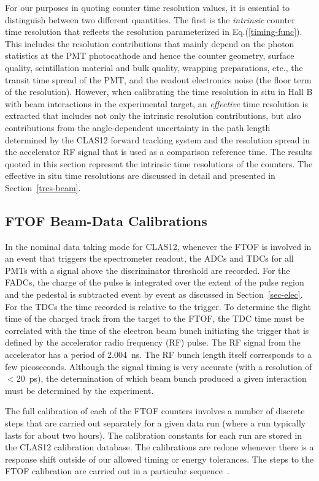 \documentclass{elsart}
\begin{document}
For our purposes in quoting counter time resolution values, it is essential to distinguish between two
different quantities. The first is the {\em intrinsic} counter time resolution that reflects the resolution
parameterized in Eq.(\ref{timing-func}). This includes the resolution contributions that mainly depend on
the photon statistics at the PMT photocathode and hence the counter geometry, surface quality, scintillation
material and bulk quality, wrapping preparations, etc., the transit time spread of the PMT, and the readout
electronics noise (the floor term of the resolution). However, when calibrating the time resolution in situ in
Hall B with beam interactions in the experimental target, an {\em effective} time resolution is extracted that
includes not only the intrinsic resolution contributions, but also contributions from the angle-dependent
uncertainty in the path length determined by the CLAS12 forward tracking system and the resolution spread
in the accelerator RF signal that is used as a comparison reference time. The results quoted in this section
represent the intrinsic time resolutions of the counters. The effective in situ time resolutions are discussed
in detail and presented in Section~\ref{tres-beam}.

\subsection{FTOF Beam-Data Calibrations}
\label{beam-data-calib}

In the nominal data taking mode for CLAS12, whenever the FTOF is involved in an event that triggers the
spectrometer readout, the ADCs and TDCs for all PMTs with a signal above the discriminator threshold are
recorded. For the FADCs, the charge of the pulse is integrated over the extent of the pulse region and the
pedestal is subtracted event by event as discussed in Section~\ref{sec-elec}. For the TDCs the time
recorded is relative to the trigger. To determine the flight time of the charged track from the target to
the FTOF, the TDC time must be correlated with the time of the electron beam bunch initiating the trigger
that is defined by the accelerator radio frequency (RF) pulse. The RF signal from the accelerator has a period
of 2.004~ns. The RF bunch length itself corresponds to a few picoseconds. Although the signal timing is very
accurate (with a resolution of $<$20~ps), the determination of which beam bunch produced a given interaction
must be determined by the experiment.

The full calibration of each of the FTOF counters involves a number of discrete steps that are carried out
separately for a given data run (where a run typically lasts for about two hours). The calibration constants
for each run are stored in the CLAS12 calibration database. The calibrations are redone whenever there is
a response shift outside of our allowed timing or energy tolerances. The steps to the FTOF calibration are
carried out in a particular sequence~\cite{ftof-calib}.
\end{document}
